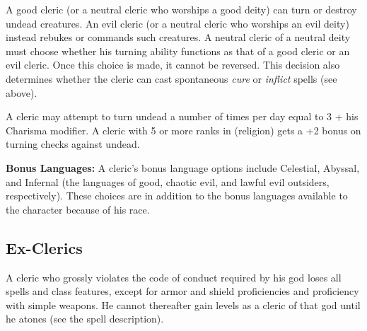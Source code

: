 A good cleric (or a neutral cleric who worships a good deity) can turn or destroy 
undead creatures. An evil cleric (or a neutral cleric who worships an evil deity) 
instead rebukes or commands such creatures. A neutral cleric of a neutral deity 
must choose whether his turning ability functions as that of a good cleric or an 
evil cleric. Once this choice is made, it cannot be reversed. This decision also 
determines whether the cleric can cast spontaneous \textit{cure} or \textit{inflict}
spells (see above).

A cleric may attempt to turn undead a number of times per day equal to 3 + his 
Charisma modifier. A cleric with 5 or more ranks in  (religion) gets a 
+2 bonus on turning checks against undead.

\textbf{Bonus Languages:} A cleric's bonus language options include Celestial, 
Abyssal, and Infernal (the languages of good, chaotic evil, and lawful evil outsiders, 
respectively). These choices are in addition to the bonus languages available to 
the character because of his race.

\subsection{Ex-Clerics}

A cleric who grossly violates the code of conduct required by his god loses all 
spells and class features, except for armor and shield proficiencies and proficiency 
with simple weapons. He cannot thereafter gain levels as a cleric of that god until 
he atones (see the  spell description).